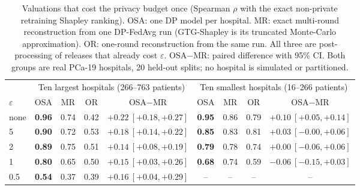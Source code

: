 \begin{table}[t]
\caption{Valuations that cost the privacy budget once (Spearman $\rho$ with the exact non-private retraining Shapley ranking). OSA: one DP model per hospital. MR: exact multi-round reconstruction from one DP-FedAvg run (GTG-Shapley is its truncated Monte-Carlo approximation). OR: one-round reconstruction from the same run. All three are post-processing of releases that already cost $\varepsilon$. OSA$-$MR: paired difference with 95\% CI. Both groups are real PCa-19 hospitals, 20 held-out splits; no hospital is simulated or partitioned.}
\centering\small
\begin{tabular}{lcccccccc}
\toprule
 & \multicolumn{4}{c}{Ten largest hospitals (266--763 patients)} & \multicolumn{4}{c}{Ten smallest hospitals (16--266 patients)} \\
\cmidrule(lr){2-5}\cmidrule(lr){6-9}
$\varepsilon$ & OSA & MR & OR & OSA$-$MR & OSA & MR & OR & OSA$-$MR \\
\midrule
none & \textbf{0.96} & 0.74 & 0.42 & $+0.22\ [+0.18, +0.27]$ & \textbf{0.95} & 0.86 & 0.79 & $+0.10\ [+0.05, +0.14]$ \\
5 & \textbf{0.90} & 0.72 & 0.53 & $+0.18\ [+0.14, +0.22]$ & \textbf{0.85} & 0.83 & 0.81 & $+0.03\ [\ensuremath{-}0.00, +0.06]$ \\
2 & \textbf{0.89} & 0.75 & 0.51 & $+0.14\ [+0.08, +0.19]$ & \textbf{0.79} & 0.78 & 0.74 & $+0.00\ [\ensuremath{-}0.06, +0.06]$ \\
1 & \textbf{0.80} & 0.65 & 0.50 & $+0.15\ [+0.03, +0.26]$ & \textbf{0.68} & 0.74 & 0.59 & $-0.06\ [\ensuremath{-}0.15, +0.03]$ \\
0.5 & \textbf{0.54} & 0.37 & 0.39 & $+0.16\ [+0.04, +0.29]$ & -- & -- & -- & -- \\
\bottomrule
\end{tabular}
\label{tab:osa_post}
\end{table}
